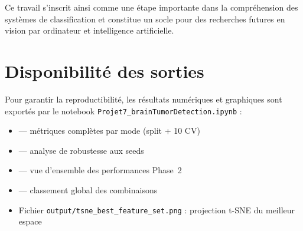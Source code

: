 \documentclass[12pt,a4paper]{article}
\begin{document}
    Ce travail s’inscrit ainsi comme une étape importante dans la compréhension des systèmes de classification et constitue un socle pour des recherches futures en vision par ordinateur et intelligence artificielle.

    \section*{Disponibilité des sorties}
    Pour garantir la reproductibilité, les résultats numériques et graphiques sont exportés par le notebook \texttt{Projet7\_brainTumorDetection.ipynb} :
    \begin{itemize}
    \item {} — métriques complètes par mode (split + 10 CV)
    \item {} — analyse de robustesse aux seeds
    \item {} — vue d’ensemble des performances Phase~2
    \item {} — classement global des combinaisons
    \item Fichier \texttt{output/tsne\_best\_feature\_set.png} : projection t-SNE du meilleur espace
    \end{itemize}
    

    
\end{document}
